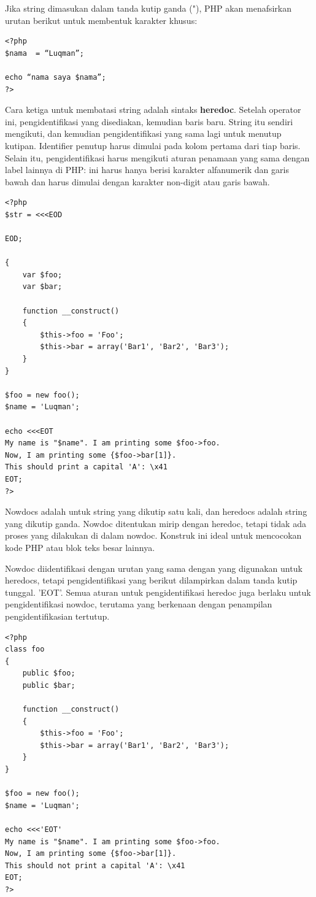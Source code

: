 Jika string dimasukan dalam tanda kutip ganda ("), PHP akan menafsirkan urutan berikut untuk membentuk karakter khusus:
\begin{lstlisting}
<?php
$nama  = “Luqman”;
 
echo “nama saya $nama”;
?>
\end{lstlisting}
Cara ketiga untuk membatasi string adalah sintaks \textbf{heredoc}. Setelah operator ini, pengidentifikasi yang disediakan, kemudian baris baru. String itu sendiri mengikuti, dan kemudian pengidentifikasi yang sama lagi untuk menutup kutipan. Identifier penutup harus dimulai pada kolom pertama dari tiap baris. Selain itu, pengidentifikasi harus mengikuti aturan penamaan yang sama dengan label lainnya di PHP: ini harus hanya berisi karakter alfanumerik dan garis bawah dan harus dimulai dengan karakter non-digit atau garis bawah.
\begin{lstlisting}
<?php
$str = <<<EOD

EOD;

{
    var $foo;
    var $bar;

    function __construct()
    {
        $this->foo = 'Foo';
        $this->bar = array('Bar1', 'Bar2', 'Bar3');
    }
}

$foo = new foo();
$name = 'Luqman';

echo <<<EOT
My name is "$name". I am printing some $foo->foo.
Now, I am printing some {$foo->bar[1]}.
This should print a capital 'A': \x41
EOT;
?>
\end{lstlisting}

Nowdocs adalah untuk string yang dikutip satu kali, dan heredocs adalah string yang dikutip ganda. Nowdoc ditentukan mirip dengan heredoc, tetapi tidak ada proses yang dilakukan di dalam nowdoc. Konstruk ini ideal untuk mencocokan kode PHP atau blok teks besar lainnya.

Nowdoc diidentifikasi dengan urutan yang sama dengan yang digunakan untuk heredocs, tetapi pengidentifikasi yang berikut dilampirkan dalam tanda kutip tunggal. 'EOT'. Semua aturan untuk pengidentifikasi heredoc juga berlaku untuk pengidentifikasi nowdoc, terutama yang berkenaan dengan penampilan pengidentifikasian tertutup.

\begin{lstlisting}
<?php
class foo
{
    public $foo;
    public $bar;

    function __construct()
    {
        $this->foo = 'Foo';
        $this->bar = array('Bar1', 'Bar2', 'Bar3');
    }
}

$foo = new foo();
$name = 'Luqman';

echo <<<'EOT'
My name is "$name". I am printing some $foo->foo.
Now, I am printing some {$foo->bar[1]}.
This should not print a capital 'A': \x41
EOT;
?>
\end{lstlisting}

